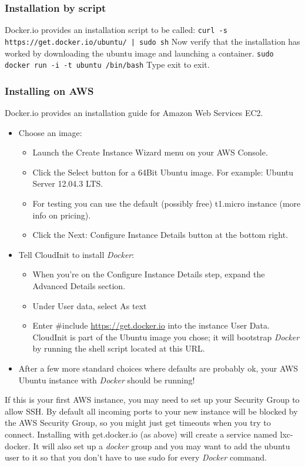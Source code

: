 \documentclass[11pt]{article}
\begin{document}
\subsubsection{Installation by script}
\label{sec-2-2-3}

Docker.io provides an installation script to be called: \texttt{curl -s https://get.docker.io/ubuntu/ | sudo sh}
Now verify that the installation has worked by downloading the ubuntu
image and launching a container. \texttt{sudo docker run -i -t ubuntu /bin/bash}
Type exit to exit.
\subsubsection{Installing on AWS}
\label{sec-2-2-4}

Docker.io provides an installation guide for Amazon Web Services EC2.
\begin{itemize}
\item Choose an image:
\begin{itemize}
\item Launch the Create Instance Wizard menu on your AWS Console.
\item Click the Select button for a 64Bit Ubuntu image. For example: Ubuntu Server 12.04.3 LTS.
\item For testing you can use the default (possibly free) t1.micro instance (more info on pricing).
\item Click the Next: Configure Instance Details button at the bottom right.
\end{itemize}
\item Tell CloudInit to install \emph{Docker}:
\begin{itemize}
\item When you're on the Configure Instance Details step, expand the Advanced Details section.
\item Under User data, select As text
\item Enter \#include \href{https://get.docker.io}{https://get.docker.io}  into the instance User Data. CloudInit is part of the Ubuntu image you chose; it will bootstrap \emph{Docker} by running the shell script located at this URL.
\end{itemize}
\item After a few more standard choices where defaults are probably ok, your AWS Ubuntu instance with \emph{Docker} should be running!
\end{itemize}
If this is your first AWS instance, you may need to set up your Security Group to allow SSH. By default all incoming ports to your new instance will be blocked by the AWS Security Group, so you might just get
timeouts when you try to connect. Installing with get.docker.io (as above) will create a service named lxc-
docker. It will also set up a \emph{docker} group and you may want to add the ubuntu user to it so that you don't have to use sudo for every \emph{Docker} command.
\end{document}
